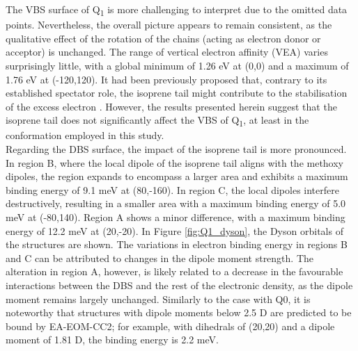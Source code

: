 The VBS surface of Q\textsubscript{1} is more challenging to interpret due to the omitted data points. Nevertheless, the overall picture appears to remain consistent, as the qualitative effect of the rotation of the chains (acting as electron donor or acceptor) is unchanged. The range of vertical electron affinity (VEA) varies surprisingly little, with a global minimum of 1.26 eV at (0,0) and a maximum of 1.76 eV at (-120,120). It had been previously proposed that, contrary to its established spectator role, the isoprene tail might contribute to the stabilisation of the excess electron \cite{pshenichnyuk2020ionizing}. However, the results presented herein suggest that the isoprene tail does not significantly affect the VBS of Q\textsubscript{1}, at least in the conformation employed in this study.\\

Regarding the DBS surface, the impact of the isoprene tail is more pronounced. In region B, where the local dipole of the isoprene tail aligns with the methoxy dipoles, the region expands to encompass a larger area and exhibits a maximum binding energy of 9.1 meV at (80,-160). In region C, the local dipoles interfere destructively, resulting in a smaller area with a maximum binding energy of 5.0 meV at (-80,140). Region A shows a minor difference, with a maximum binding energy of 12.2 meV at (20,-20). In Figure \ref{fig:Q1_dyson}, the Dyson orbitals of the structures are shown. The variations in electron binding energy in regions B and C can be attributed to changes in the dipole moment strength. The alteration in region A, however, is likely related to a decrease in the favourable interactions between the DBS and the rest of the electronic density, as the dipole moment remains largely unchanged. Similarly to the case with Q0, it is noteworthy that structures with dipole moments below 2.5 D are predicted to be bound by EA-EOM-CC2; for example, with dihedrals of (20,20) and a dipole moment of 1.81 D, the binding energy is 2.2 meV.\\

